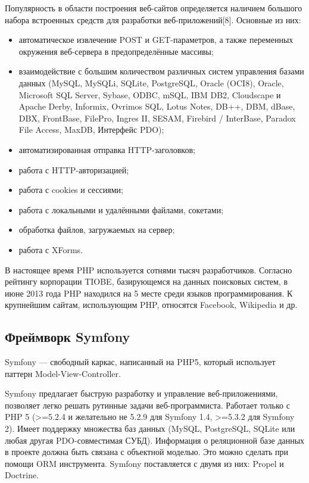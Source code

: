 Популярность в области построения веб-сайтов определяется наличием большого набора встроенных средств для разработки веб-приложений[8]. Основные из них:
\begin{itemize}
    \item автоматическое извлечение POST и GET-параметров, а также переменных окружения веб-сервера в предопределённые массивы;
    \item взаимодействие с большим количеством различных систем управления базами данных (MySQL, MySQLi, SQLite, PostgreSQL, Oracle (OCI8), Oracle, Microsoft SQL Server, Sybase, ODBC, mSQL, IBM DB2, Cloudscape и Apache Derby, Informix, Ovrimos SQL, Lotus Notes, DB++, DBM, dBase, DBX, FrontBase, FilePro, Ingres II, SESAM, Firebird / InterBase, Paradox File Access, MaxDB, Интерфейс PDO);
    \item автоматизированная отправка HTTP-заголовков;
    \item работа с HTTP-авторизацией;
    \item работа с cookies и сессиями;
    \item работа с локальными и удалёнными файлами, сокетами;
    \item обработка файлов, загружаемых на сервер;
    \item работа с XForms.
\end{itemize}

В настоящее время PHP используется сотнями тысяч разработчиков. Согласно рейтингу корпорации TIOBE, базирующемся на данных поисковых систем, в июне 2013 года PHP находился на 5 месте среди языков программирования. К крупнейшим сайтам, использующим PHP, относятся Facebook, Wikipedia и др.


\subsection{Фреймворк Symfony}


Symfony — свободный каркас, написанный на PHP5, который использует паттерн Model-View-Controller.

Symfony предлагает быструю разработку и управление веб-приложениями, позволяет легко решать рутинные задачи веб-программиста. Работает только с PHP 5 (>=5.2.4 и желательно не 5.2.9 для Symfony 1.4, >=5.3.2 для Symfony 2). Имеет поддержку множества баз данных (MySQL, PostgreSQL, SQLite или любая другая PDO-совместимая СУБД). Информация о реляционной базе данных в проекте должна быть связана с объектной моделью. Это можно сделать при помощи ORM инструмента. Symfony поставляется с двумя из них: Propel и Doctrine.

